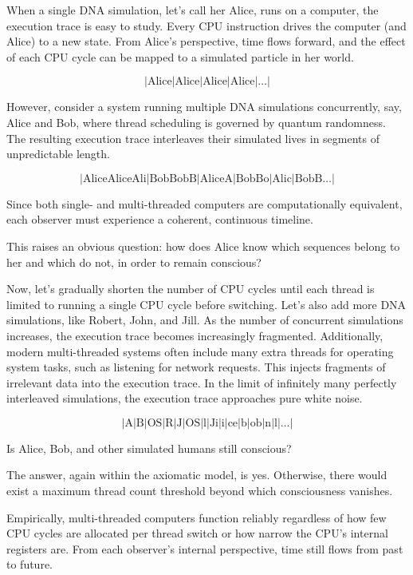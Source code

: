 When a single DNA simulation, let's call her Alice, runs on a computer, the execution trace is easy to study.
Every CPU instruction drives the computer (and Alice) to a new state.
From Alice's perspective, time flows forward, and the effect of each CPU cycle can be mapped to a simulated particle in her world.

\[
| \text{Alice}|\text{Alice}|\text{Alice}|\text{Alice}|\dots|
\]

However, consider a system running multiple DNA simulations concurrently, say, Alice and Bob, where thread scheduling is governed by quantum randomness.
The resulting execution trace interleaves their simulated lives in segments of unpredictable length.

\[
|\text{AliceAliceAli}|\text{BobBobB}|\text{AliceA}|\text{BobBo}|\text{Alic}|\text{BobB}\dots|
\]

Since both single- and multi-threaded computers are computationally equivalent, each observer must experience a coherent, continuous timeline.

This raises an obvious question: how does Alice know which sequences belong to her and which do not, in order to remain conscious?

Now, let's gradually shorten the number of CPU cycles until each thread is limited to running a single CPU cycle before switching.
Let's also add more DNA simulations, like Robert, John, and Jill. As the number of concurrent simulations increases, the execution trace becomes increasingly fragmented.
Additionally, modern multi-threaded systems often include many extra threads for operating system tasks, such as listening for network requests.
This injects fragments of irrelevant data into the execution trace.
In the limit of infinitely many perfectly interleaved simulations, the execution trace approaches pure white noise.

\[
|\text{A}| \text{B}| \text{OS}| \text{R}| \text{J}| \text{OS}| \text{l}| \text{Ji}| \text{i}| \text{ce}| \text{b}| \text{ob}| \text{n}| \text{l}| \dots|
\]

Is Alice, Bob, and other simulated humans still conscious?

The answer, again within the axiomatic model, is yes. Otherwise, there would exist a maximum thread count threshold beyond which consciousness vanishes.

Empirically, multi-threaded computers function reliably regardless of how few CPU cycles are allocated per thread switch or how narrow the CPU’s internal registers are.
From each observer's internal perspective, time still flows from past to future.

